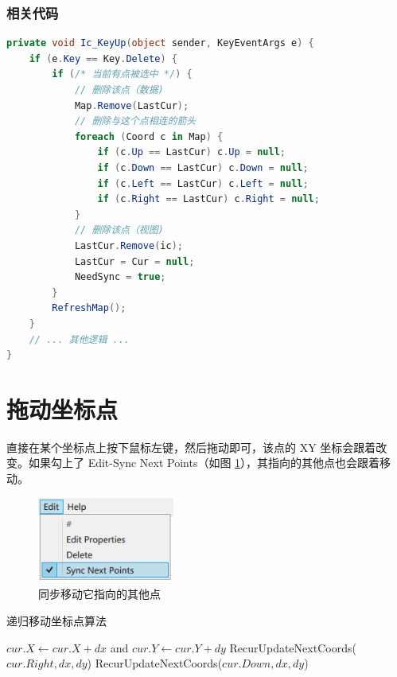 \subsubsection{相关代码}

\begin{lstlisting}[language=cs]
private void Ic_KeyUp(object sender, KeyEventArgs e) {
    if (e.Key == Key.Delete) {
        if (/* 当前有点被选中 */) {
            // 删除该点（数据)
            Map.Remove(LastCur);
            // 删除与这个点相连的箭头
            foreach (Coord c in Map) {
                if (c.Up == LastCur) c.Up = null;
                if (c.Down == LastCur) c.Down = null;
                if (c.Left == LastCur) c.Left = null;
                if (c.Right == LastCur) c.Right = null;
            }
            // 删除该点（视图)
            LastCur.Remove(ic);
            LastCur = Cur = null;
            NeedSync = true;
        }
        RefreshMap();
    }
    // ... 其他逻辑 ...
}
\end{lstlisting}

\section{拖动坐标点}

直接在某个坐标点上按下鼠标左键，然后拖动即可，该点的 XY 坐标会跟着改变。如果勾上了 Edit-Sync Next Points（如图 \ref{fig:sync}），其指向的其他点也会跟着移动。

\begin{figure}[H]
  \centering
  \includegraphics[width=0.4\textwidth]{assets/sync.png}
  \caption{同步移动它指向的其他点}
  \label{fig:sync}
\end{figure}

\begin{algorithm}[H]
  \caption{递归移动坐标点算法}
  \begin{algorithmic}[1]
    \State $cur.X \gets cur.X + dx$ and $cur.Y \gets cur.Y + dy$
      \State RecurUpdateNextCoords($cur.Right, dx, dy$)
    \EndIf
      \State RecurUpdateNextCoords($cur.Down, dx, dy$)
    \EndIf
    \EndProcedure
  \end{algorithmic}
\end{algorithm}

